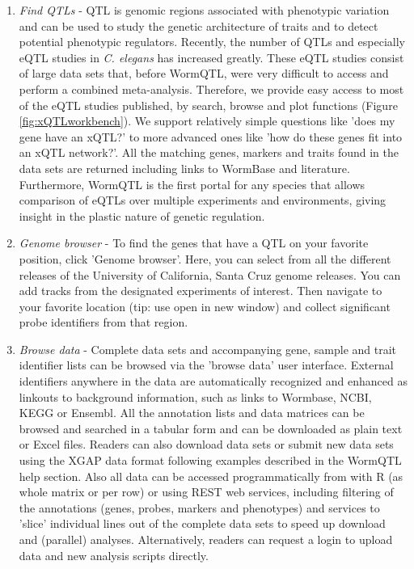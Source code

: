 \begin{enumerate}\itemsep1pt
\item \emph{Find QTLs} - QTL is genomic regions associated with phenotypic variation and can be 
used to study the genetic architecture of traits and to detect potential phenotypic regulators. 
Recently, the number of QTLs and especially eQTL studies in \emph{C. elegans} has increased greatly. 
These eQTL studies consist of large data sets that, before WormQTL, were very difficult to access 
and perform a combined meta-analysis. Therefore, we provide easy access to most of the eQTL studies 
published, by search, browse and plot functions (Figure \ref{fig:xQTLworkbench}). We support relatively simple questions like 
'does my gene have an xQTL?' to more advanced ones like 'how do these genes fit into an xQTL network?'. 
All the matching genes, markers and traits found in the data sets are returned including links to 
WormBase and literature. Furthermore, WormQTL is the first portal for any species that allows comparison 
of eQTLs over multiple experiments and environments, giving insight in the plastic nature of genetic 
regulation.
\item \emph{Genome browser} - To find the genes that have a QTL on your favorite position, click 
'Genome browser'. Here, you can select from all the different releases of the University of California, 
Santa Cruz genome releases. You can add tracks from the designated experiments of interest. Then 
navigate to your favorite location (tip: use open in new window) and collect significant probe 
identifiers from that region.
\item \emph{Browse data} - Complete data sets and accompanying gene, sample and trait identifier 
lists can be browsed via the 'browse data' user interface. External identifiers anywhere in the 
data are automatically recognized and enhanced as linkouts to background information, such as links 
to Wormbase, NCBI, KEGG or Ensembl. All the annotation lists and data matrices can be browsed and 
searched in a tabular form and can be downloaded as plain text or Excel files. Readers can also 
download data sets or submit new data sets using the XGAP data format following examples described 
in the WormQTL help section. Also all data can be accessed programmatically from with R (as whole 
matrix or per row) or using REST web services, including filtering of the annotations (genes, probes, 
markers and phenotypes) and services to 'slice' individual lines out of the complete data sets to 
speed up download and (parallel) analyses. Alternatively, readers can request a login to upload 
data and new analysis scripts directly.
\end{enumerate}

